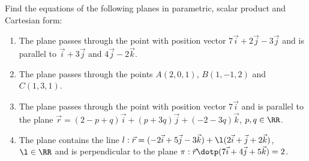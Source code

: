 \begin{problem}
    Find the equations of the following planes in parametric, scalar product and Cartesian form:

    \begin{enumerate}
        \item The plane passes through the point with position vector $7\vec i + 2 \vec j -3\vec j$ and is parallel to $\vec i + 3\vec j$ and $4\vec j - 2\vec k$.
        \item The plane passes through the points $A(2, 0, 1)$, $B(1, -1, 2)$ and $C(1, 3, 1)$.
        \item The plane passes through the point with position vector $7\vec i$ and is parallel to the plane $\vec r = (2 - p + q)\vec i + (p + 3q)\vec j + (-2-3q)\vec k$, $p, q \in \RR$.
        \item The plane contains the line $l : \vec r = (-2\vec i + 5\vec j -3\vec k) + \l(2\vec i + \vec j + 2\vec k)$, $\l \in \RR$ and is perpendicular to the plane $\pi : \vec r \dotp (7\vec i + 4\vec j + 5\vec k) = 2$.
    \end{enumerate}
\end{problem}
